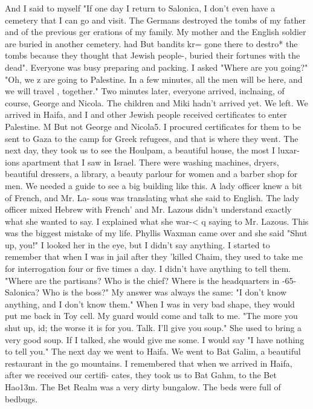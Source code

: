 And I said to myself "If one day I return to Salonica, I don't even have a cemetery that 
I can go and visit.
The Germans destroyed the tombs of my father and of the previous ger 
erations of my family.
My mother and the English soldier are buried in another cemetery.
had 
But bandits kr= gone there to destro* the tombs because they thought that Jewish people-, 
buried their fortunes with the dead".
Everyone was busy preparing and packing.
I asked "Where are you going?"
"Oh, we z 
are going to Palestine.
In a few minutes, all the men will be here, and we will travel , 
together."
Two minutes later, everyone arrived, inclnaing, of course, George and Nicola.
The children and Miki hadn't arrived yet.
We left.
We arrived in Haifa, and I and other Jewish people received certificates to enter 
Palestine.
M But not George and Nicola5.
I procured certificates for them to be sent 
to Gaza to the camp for Greek refugees, and that is where they went.
The next day, they took us to see the Houlpam, a beautiful house, the most I luxar-
ions apartment that I saw in Israel.
There were washing machines, dryers, beautiful 
dressers, a library, a beauty parlour for women and a barber shop for men.
We needed a 
guide to see a big building like this.
A lady officer knew a bit of French, and Mr.
La-
sous was translating what she said to English.
The lady officer mixed Hebrew with French' 
and Mr.
Lazous didn't understand exactly what she wanted to say.
I explained what she war-<
q 
saying to Mr.
Lazous.
This was the biggest mistake of my life.
Phyllis Waxman came over 
and she said "Shut up, you!"
I looked her in the eye, but I didn't say anything.
I started to remember that when I was in jail after they 'killed Chaim, they used to 
take me for interrogation four or five times a day.
I didn't have anything to tell 
them.
"Where are the partisans?
Who is the chief?
Where is the headquarters in 
-65- 
Salonica?
Who is the boss?"
My answer was always the same: "I don't know anything, 
and I don't know them."
When I was in very bad shape, they would put me back in Toy cell.
My guard would come and talk to me.
"The more you shut up, id; the worse it is for you.
Talk.
I'll give you soup."
She used to bring a very good soup.
If I talked, she would 
give me some.
I would say "I have nothing to tell you."
The next day we went to Haifa.
We went to Bat Galim, a beautiful restaurant in the 
go 
mountains.
I remembered that when we arrived in Haifa, after we received our certifi-
cates, they took us to Bat Gahm, to the Bet Hao13m.
The Bet Realm was a very dirty bungalow.
The beds were full of bedbugs.
